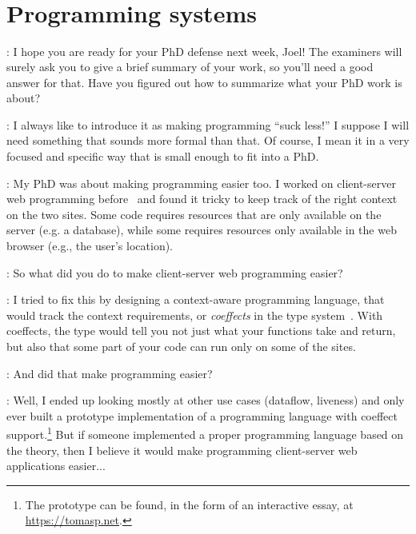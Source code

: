\documentclass[runningheads]{llncs}
\newcommand{\T}{Tomas}
\newcommand{\J}{Joel}
\newcommand{\says}[2][gg]{\vspace{0.5em}\noindent\hangindent=0.5cm{\textsc{#1}}: #2}
\begin{document}
~

~

~

~

\section{Programming systems}

\says[\T]{I hope you are ready for your PhD defense next week, Joel! The examiners will surely ask you to give a brief summary of your work, so you'll need a good answer for that. Have you figured out how to summarize what your PhD work is about?}

\says[\J]{I always like to introduce it as making programming ``suck less!'' I suppose I will need something that sounds more formal than that. Of course, I mean it in a very focused and specific way that is small enough to fit into a PhD.}

\says[\T]{My PhD was about making programming easier too. I worked on client-server web programming before~\cite{petricek-2007-fswebtools} and found it tricky to keep track of the right context on the two sites. Some code requires resources that are only available on the server (e.g. a database), while some requires resources only available in the web browser (e.g., the user's location).}

\says[\J]{So what did you do to make client-server web programming easier?}

\says[\T]{I tried to fix this by designing a context-aware programming language, that would track the context requirements, or \emph{coeffects} in the type system~\cite{petricek-2013-coeffects}. With coeffects, the type would tell you not just what your functions take and return, but also that some part of your code can run only on some of the sites.}

\says[\J]{And did that make programming easier?}

\says[\T]{Well, I ended up looking mostly at other use cases (dataflow, liveness) and only ever built a prototype implementation of a programming language with coeffect support.\footnote{The prototype can be found, in the form of an interactive essay, at \url{https://tomasp.net}.} But if someone implemented a proper programming language based on the theory, then I believe it would make programming client-server web applications easier...}
\end{document}
